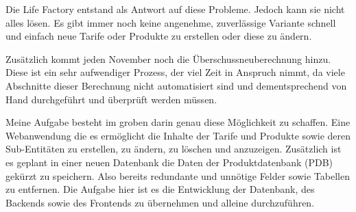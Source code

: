 Die Life Factory entstand als Antwort auf diese Probleme. Jedoch kann sie nicht alles lösen.
Es gibt immer noch keine angenehme, zuverlässige Variante schnell und einfach neue Tarife oder Produkte zu erstellen oder diese zu ändern.

Zusätzlich kommt jeden November noch die Überschussneuberechnung hinzu. Diese ist ein sehr aufwendiger Prozess, der viel Zeit in Anspruch nimmt,
da viele Abschnitte dieser Berechnung nicht automatisiert sind und dementsprechend von Hand durchgeführt und überprüft werden müssen.

Meine Aufgabe besteht im groben darin genau diese Möglichkeit zu schaffen. Eine Webanwendung die es ermöglicht die Inhalte der Tarife und Produkte sowie deren Sub-Entitäten
zu erstellen, zu ändern, zu löschen und anzuzeigen. Zusätzlich ist es geplant in einer neuen Datenbank die Daten der Produktdatenbank (PDB) gekürzt zu speichern.
Also bereits redundante und unnötige Felder sowie Tabellen zu entfernen. Die Aufgabe hier ist es die Entwicklung der Datenbank, des Backends sowie des Frontends zu übernehmen und alleine durchzuführen.
